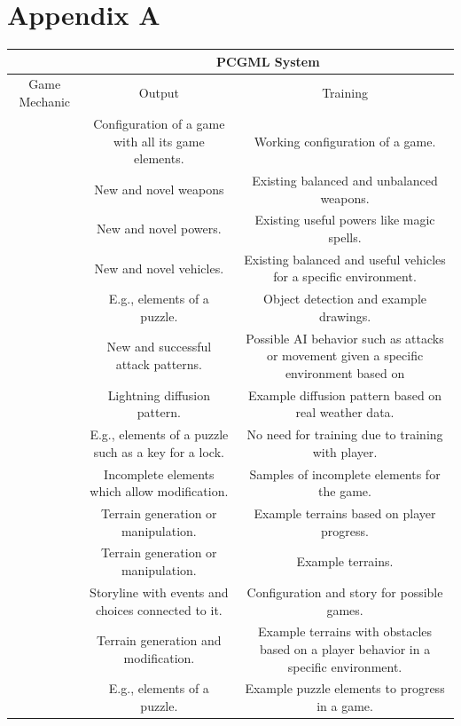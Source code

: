 \documentclass[MGS,Master,english]{twbook}%
\begin{document}
\chapter{Appendix A} \label{gameMechanicIdeaSummary}
\begin{tabular}{|c||c|c|}
	\hline 
	& \multicolumn{2}{c|}{PCGML System} \\ 
	\hline 
	Game Mechanic & Output & Training \\ 
	\hline \hline 
	\nameref{idea::rulesAndBehavior} & Configuration of a game with all its game elements. & Working configuration of a game. \\ 
	\hline 
	\nameref{idea::changingWeapons} & New and novel weapons & Existing balanced and unbalanced weapons. \\ 
	\hline 
	\nameref{idea::changingPowers} & New and novel powers. & Existing useful powers like magic spells. \\ 
	\hline 
	\nameref{idea::novelCars} & New and novel vehicles.  & Existing balanced and useful vehicles for a specific environment. \\ 
	\hline 
	\nameref{idea::solverWeapon} & E.g., elements of a puzzle. & Object detection and example drawings. \\ 
	\hline 
	\nameref{idea::defeatTheEnemy} & New and successful attack patterns. & Possible AI behavior such as attacks or movement given a specific environment based on \\ 
	\hline 
	\nameref{idea::caughtInAThunderstorm} & Lightning diffusion pattern. & Example diffusion pattern based on real weather data. \\ 
	\hline 
	\nameref{idea::trainToProgress} & E.g., elements of a puzzle such as a key for a lock. & No need for training due to training with player. \\ 
	\hline 
	\nameref{idea::buildingWithAssistance} & Incomplete elements which allow modification. & Samples of incomplete elements for the game. \\ 
	\hline 
	\nameref{idea::exploringCoWorker} & Terrain generation or manipulation. & Example terrains based on player progress. \\ 
	\hline 
	\nameref{idea::observeAndLearn} & Terrain generation or manipulation. & Example terrains. \\ 
	\hline 
	\nameref{idea::expressYourself} & Storyline with events and choices connected to it. & Configuration and story for possible games. \\ 
	\hline 
	\nameref{idea::bigBossHelper} & Terrain generation and modification. & Example terrains with obstacles based on a player behavior in a specific environment. \\ 
	\hline 
	\nameref{idea::figureItOut} & E.g., elements of a puzzle. & Example puzzle elements to progress in a game. \\ 
	\hline 
\end{tabular} 
\end{document}
